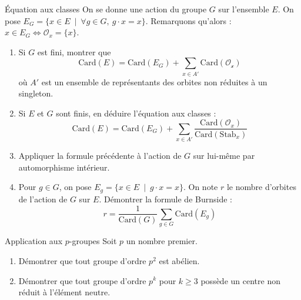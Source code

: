 \documentclass[french,a4paper]{article}
\newcommand{\card}{\text{Card}}
\theoremstyle{plain}
\theoremstyle{definition}
\theoremstyle{remark}
\begin{document}
\begin{ex}{Équation aux classes}
	On se donne une action du groupe $G$ sur l'ensemble $E$. On pose $E_G=\{x\in E\ \mid\ \forall g\in G,\ g\cdot x=x\}$. Remarquons qu'alors : $x\in E_G\iff \mathcal{O}_x=\{x\}$.
	\begin{enumerate}
		\item Si $G$ est fini, montrer que $$\card(E)=\card(E_G)+\sum_{x\in A'}\card(\mathcal{O_x})$$ où $A'$ est un ensemble de représentants des orbites non réduites à un singleton.
		\item Si $E$ et $G$ sont finis, en déduire l'équation aux classes : $$\card(E)=\card(E_G)+\sum_{x\in A'}\frac{\card(\mathcal{O}_x)}{\card(\text{Stab}_x)}$$
		\item Appliquer la formule précédente à l'action de $G$ sur lui-même par automorphisme intérieur.
		\item Pour $g\in G$, on pose $E_g=\{x\in E\ \mid\ g\cdot x=x\}$. On note $r$ le nombre d'orbites de l'action de $G$ sur $E$. Démontrer la formule de Burnside : $$r=\frac{1}{\card(G)}\sum_{g\in G}\card(E_g)$$
	\end{enumerate}
\end{ex}
\begin{ex}{Application aux $p$-groupes}
	Soit $p$ un nombre premier.
	\begin{enumerate}
		\item Démontrer que tout groupe d'ordre $p^2$ est abélien.
		\item Démontrer que tout groupe d'ordre $p^k$ pour $k\geqslant 3$ possède un centre non réduit à l'élément neutre.
	\end{enumerate}
\end{ex}
\end{document}
